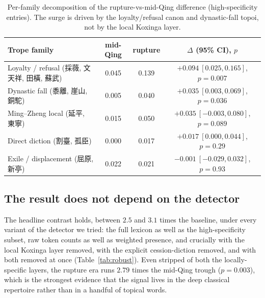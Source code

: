 \documentclass[10pt,twocolumn]{article}
\begin{document}
\begin{table}[t]
\centering
\footnotesize
\caption{Per-family decomposition of the rupture-vs-mid-Qing difference (high-specificity
entries). The surge is driven by the loyalty/refusal canon and dynastic-fall topoi, not by
the local Koxinga layer.}
\label{tab:cat}
\begin{tabular}{lccc}
\toprule
Trope family & mid-Qing & rupture & $\Delta$ (95\% CI), $p$ \\
\midrule
Loyalty / refusal (採薇, 文天祥, 田橫, 蘇武) & 0.045 & 0.139 & $+0.094\ [0.025,0.165]$, $p{=}0.007$ \\
Dynastic fall (黍離, 崖山, 銅駝)            & 0.005 & 0.040 & $+0.035\ [0.003,0.069]$, $p{=}0.036$ \\
Ming--Zheng local (延平, 東寧)             & 0.015 & 0.050 & $+0.035\ [-0.003,0.080]$, $p{=}0.089$ \\
Direct diction (割臺, 孤臣)                & 0.000 & 0.017 & $+0.017\ [0.000,0.044]$, $p{=}0.29$ \\
Exile / displacement (屈原, 新亭)          & 0.022 & 0.021 & $-0.001\ [-0.029,0.032]$, $p{=}0.93$ \\
\bottomrule
\end{tabular}
\end{table}

\subsection{The result does not depend on the detector}
The headline contrast holds, between $2.5$ and $3.1$ times the baseline, under every variant
of the detector we tried: the full lexicon as well as the high-specificity subset, raw token
counts as well as weighted presence, and crucially with the local Koxinga layer removed, with
the explicit cession-diction removed, and with both removed at once
(Table~\ref{tab:robust}). Even stripped of both the locally-specific layers, the rupture era
runs $2.79$ times the mid-Qing trough ($p=0.003$), which is the strongest evidence that the
signal lives in the deep classical repertoire rather than in a handful of topical words.
\end{document}
